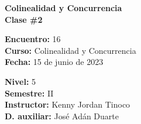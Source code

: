 \begin{center} \textbf
{
    \Large Colinealidad y Concurrencia \\ \vspace{2mm}Clase \#2
}
\end{center}

\begin{multicols}{2}
{
    \textbf{Encuentro:} 16\\
    \textbf{Curso:} Colinealidad y Concurrencia\\
    \textbf{Fecha:} 15 de junio de 2023\\
    \begin{flushright}
        \textbf{Nivel:} 5\\
        \textbf{Semestre:} II\\
        \textbf{Instructor:} Kenny Jordan Tinoco\\
        \textbf{D. auxiliar: }José Adán Duarte
    \end{flushright}
}
\end{multicols}

\thispagestyle{first-page-style}